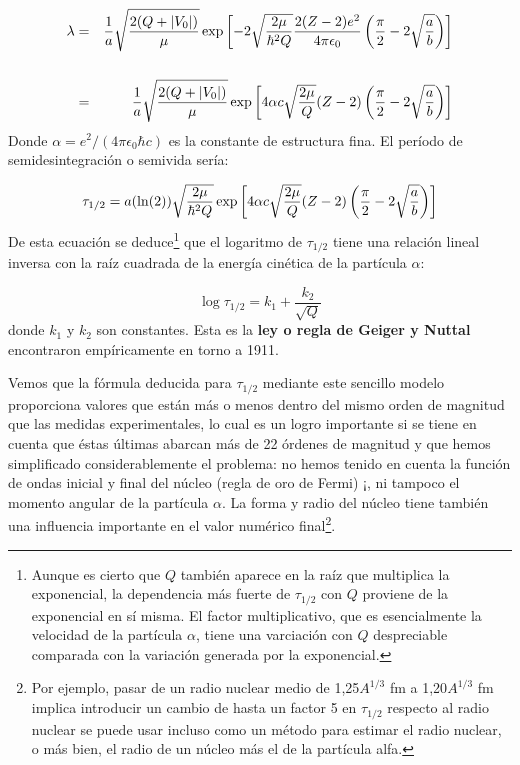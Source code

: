 \begin{eqnarray}
    \lambda & = & \frac{1}{a} \sqrt{\frac{2(Q+|V_0|)}{\mu}} \exp \left[ -2  \sqrt{\frac{2 \mu}{\hbar^2 Q}} \frac{2(Z-2)e^2}{4 \pi \epsilon_0} \left( \frac{\pi}{2}-2\sqrt{\frac{a}{b}} \right) \right] \\ \\
            & = & \frac{1}{a} \sqrt{\frac{2(Q+|V_0|)}{\mu}}  \exp \left[ 4 \alpha c \sqrt{\frac{2 \mu}{Q}} (Z-2) \left( \frac{\pi}{2}-2\sqrt{\frac{a}{b}} \right) \right]
\end{eqnarray}
Donde $\alpha=e^2/(4 \pi \epsilon_0 \hbar c)$ es la constante de estructura fina. El período de semidesintegración o semivida sería:

\begin{equation}
    \tau_{1/2} = a (\ln (2)) \sqrt{\frac{2\mu}{\hbar^2Q}} \exp \left[ 4 \alpha c \sqrt{\frac{2 \mu}{Q}} (Z-2) \left( \frac{\pi}{2}-2\sqrt{\frac{a}{b}} \right) \right]
\end{equation}
De esta ecuación se deduce\footnote{Aunque es cierto que $Q$ también aparece en la raíz que multiplica la exponencial, la dependencia más fuerte de $\tau_{1/2}$ con $Q$ proviene de la exponencial en sí misma. El factor multiplicativo, que es esencialmente la velocidad de la partícula $\alpha$, tiene una varciación con $Q$ despreciable comparada con la variación generada por la exponencial.} que el logaritmo de $\tau_{1/2}$ tiene una relación lineal inversa con la raíz cuadrada de la energía cinética de la partícula $\alpha$:

\begin{equation}
    \log \tau_{1/2} = k_1 + \frac{k_2}{\sqrt{Q}}
\end{equation}
donde $k_1$ y $k_2$ son constantes. Esta es la \textbf{ley o regla de Geiger y Nuttal} encontraron empíricamente en torno a 1911. %

Vemos que la fórmula deducida para $\tau_{1/2}$ mediante este sencillo modelo proporciona valores que están más o menos dentro del mismo orden de magnitud que las medidas experimentales, lo cual es un logro importante si se tiene en cuenta que éstas últimas abarcan más de 22 órdenes de magnitud y que hemos simplificado considerablemente el problema: no hemos tenido en cuenta la función de ondas inicial y final del núcleo (regla de oro de Fermi) ¡, ni tampoco el momento angular de la partícula $\alpha$. La forma y radio del núcleo tiene también una influencia importante en el valor numérico final\footnote{Por ejemplo, pasar de un radio nuclear medio de 1,25$A^{1/3}$ fm a 1,20$A^{1/3}$ fm implica introducir un cambio de hasta un factor 5 en $\tau_{1/2}$ respecto al radio nuclear se puede usar incluso como un método para estimar el radio nuclear, o más bien, el radio de un núcleo más el de la partícula alfa.}.

